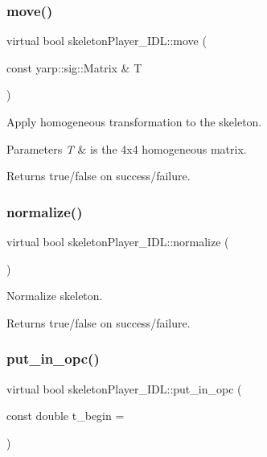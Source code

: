 \subsubsection{\texorpdfstring{move()}{move()}}
{\footnotesize\ttfamily virtual bool skeleton\+Player\+\_\+\+I\+D\+L\+::move (\begin{DoxyParamCaption}\item[{const yarp\+::sig\+::\+Matrix \&}]{T }\end{DoxyParamCaption})\hspace{0.3cm}{\ttfamily [virtual]}}



Apply homogeneous transformation to the skeleton. 


\begin{DoxyParams}{Parameters}
{\em T} & is the 4x4 homogeneous matrix. \\
\hline
\end{DoxyParams}
\begin{DoxyReturn}{Returns}
true/false on success/failure. 
\end{DoxyReturn}
\mbox{\label{classskeletonPlayer__IDL_ab77b1ce1855a8fbdc352ac22ed9a6cf4}} 
\subsubsection{\texorpdfstring{normalize()}{normalize()}}
{\footnotesize\ttfamily virtual bool skeleton\+Player\+\_\+\+I\+D\+L\+::normalize (\begin{DoxyParamCaption}{ }\end{DoxyParamCaption})\hspace{0.3cm}{\ttfamily [virtual]}}



Normalize skeleton. 

\begin{DoxyReturn}{Returns}
true/false on success/failure. 
\end{DoxyReturn}
\mbox{\label{classskeletonPlayer__IDL_a9b02f3ee360ef27a1ec1b3f321fa5ed7}} 
\subsubsection{\texorpdfstring{put\_in\_opc()}{put\_in\_opc()}}
{\footnotesize\ttfamily virtual bool skeleton\+Player\+\_\+\+I\+D\+L\+::put\+\_\+in\+\_\+opc (\begin{DoxyParamCaption}\item[{const double}]{t\+\_\+begin = {} }\end{DoxyParamCaption})\hspace{0.3cm}{\ttfamily [virtual]}}



